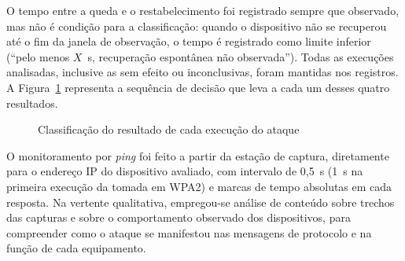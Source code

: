 O tempo entre a queda e o restabelecimento foi registrado sempre que observado, mas não é condição para a classificação: quando o dispositivo não se recuperou até o fim da janela de observação, o tempo é registrado como limite inferior (``pelo menos $X$~s, recuperação espontânea não observada''). Todas as execuções analisadas, inclusive as sem efeito ou inconclusivas, foram mantidas nos registros. A Figura~\ref{fig:criterios_sucesso} representa a sequência de decisão que leva a cada um desses quatro resultados.

\begin{figure}[htb]
\centering
\caption{Classificação do resultado de cada execução do ataque}
\label{fig:criterios_sucesso}
\end{figure}

O monitoramento por \textit{ping} foi feito a partir da estação de captura, diretamente para o endereço IP do dispositivo avaliado, com intervalo de 0,5~s (1~s na primeira execução da tomada em WPA2) e marcas de tempo absolutas em cada resposta. Na vertente qualitativa, empregou-se análise de conteúdo sobre trechos das capturas e sobre o comportamento observado dos dispositivos, para compreender como o ataque se manifestou nas mensagens de protocolo e na função de cada equipamento.

